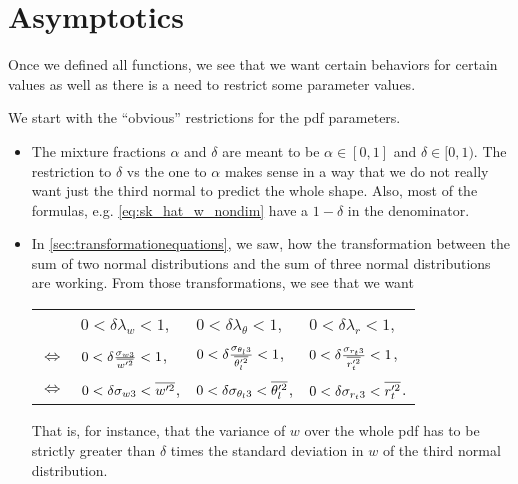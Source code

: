\chapter{Asymptotics}\label{ch:asymptotics}

Once we defined all functions, we see that we want certain behaviors for certain values as well as there is a need to restrict some parameter values.

We start with the \enquote{obvious} restrictions for the \gls{pdf} parameters.
\begin{itemize}
    \item The mixture fractions $\alpha$ and $\delta$ are meant to be $\alpha \in [0,1]$ and $\delta \in [0,1)$.
    The restriction to $\delta$ vs the one to $\alpha$ makes sense in a way that we do not really want just the third normal to predict the whole shape.
    Also, most of the formulas, e.g. \cref{eq:sk_hat_w_nondim} have a $1-\delta$ in the denominator.

    \item In \cref{sec:transformationequations}, we saw, how the transformation between the sum of two normal distributions and the sum of three normal distributions are working.
    From those transformations, we see that we want
    \begin{table}[!ht]
        \centering
        \begin{tabular}{llll}
            &
            $0 < \delta\lambda_w < 1$, &
            $0 < \delta\lambda_\theta < 1$, &
            $0 < \delta\lambda_r < 1$, \\
            $\iff$ &
            $0 < \delta\frac{\sigma_{w3}}{\overline{w'^2}} < 1$, &
            $0 < \delta\frac{\sigma_{\theta_l 3}}{\overline{\theta_l'^2}} < 1$, &
            $0 < \delta\frac{\sigma_{r_t 3}}{\overline{r_t'^2}} < 1$, \\
            $\iff$ &
            $0 < \delta\sigma_{w3} < \overline{w'^2}$, &
            $0 < \delta\sigma_{\theta_l 3} < \overline{\theta_l'^2}$, &
            $0 < \delta\sigma_{r_t 3} < \overline{r_t'^2}$.
        \end{tabular}
        \label{tab:table_asymp_2}
    \end{table}
    That is, for instance, that the variance of $w$ over the whole \gls{pdf} has to be strictly greater than $\delta$ times the standard deviation in $w$ of the third normal distribution.
\end{itemize}

